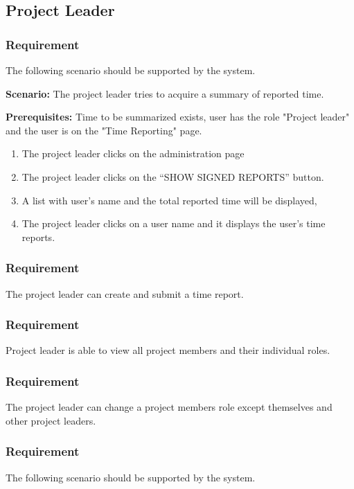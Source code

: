 \documentclass{article}
\begin{document}
\subsection{Project Leader}
\subsubsection{Requirement}
The following scenario should be supported by the system.

\textbf{Scenario:} The project leader tries to acquire a summary of reported time.

\textbf{Prerequisites:} Time to be summarized exists, user has the role "Project leader" and the user is on the "Time Reporting" page.

\begin{enumerate}
    \item The project leader clicks on the administration page 
    \item The project leader clicks on the “SHOW SIGNED REPORTS” button.
    \item A list with user’s name and the total reported time will be displayed,
    \item The project leader clicks on a user name and it displays the user’s time reports.
\end{enumerate}

\subsubsection{Requirement}
The project leader can create and submit a time report.

\subsubsection{Requirement}
Project leader is able to view all project members and their individual roles.


\subsubsection{Requirement}
The project leader can change a project members role except themselves and other project leaders.

\subsubsection{Requirement}
The following scenario should be supported by the system.
\end{document}
